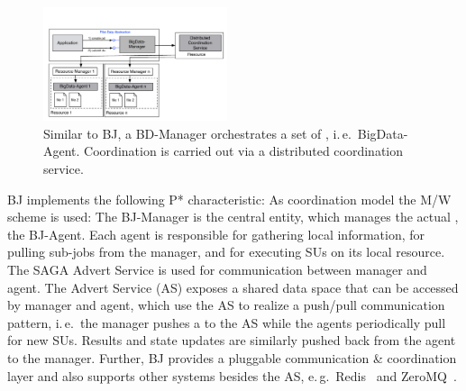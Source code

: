 \documentclass[conference]{IEEEtran}
\begin{document}
\begin{figure}[t]
	\up\upp
	\centering
	\includegraphics[width=0.48\textwidth]{../figures/bigdata_pmr.pdf}
	\caption{ Similar to BJ, a BD-Manager orchestrates a set of \pilots, i.\,e.\ BigData-Agent. Coordination is carried out via a distributed coordination service. \upp\upp }
	\label{fig:bigdata}
\end{figure}


BJ implements the following P* characteristic: As coordination model
the M/W scheme is used: The BJ-Manager is the central entity, which
manages the actual \pilot, the BJ-Agent. Each agent is responsible for
gathering local information, for pulling sub-jobs from the manager,
and for executing SUs on its local resource. The SAGA Advert Service
is used for communication between manager and agent. The Advert
Service (AS) exposes a shared data space that can be accessed by
manager and agent, which use the AS to realize a push/pull
communication pattern, i.\,e.\ the manager pushes a \su to the AS while
the agents periodically pull for new SUs. Results and state updates
are similarly pushed back from the agent to the manager. Further, BJ
provides a pluggable communication \& coordination layer and also
supports other \cc systems besides the AS, e.\,g.\ Redis~\cite{redis}
and ZeroMQ~\cite{zmq}.



% 
\end{document}
